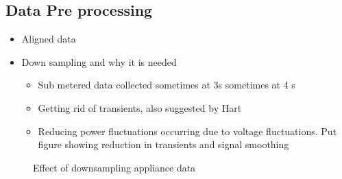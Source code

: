 \documentclass[conference]{IEEEtran}
\begin{document}
\subsection{Data Pre processing}
\begin{itemize}
\item Aligned data
\item Down sampling and why it is needed
\begin{itemize}
\item Sub metered data collected sometimes at 3s sometimes at 4 s
\item Getting rid of transients, also suggested by Hart
\item Reducing power fluctuations occurring due to voltage fluctuations. Put figure showing reduction in transients and signal smoothing
\end{itemize}
\end{itemize}
\begin{figure} 
	
  	\caption{Effect of downsampling appliance data}
    \label{fig:downsampling}
\end{figure}
\end{document}
